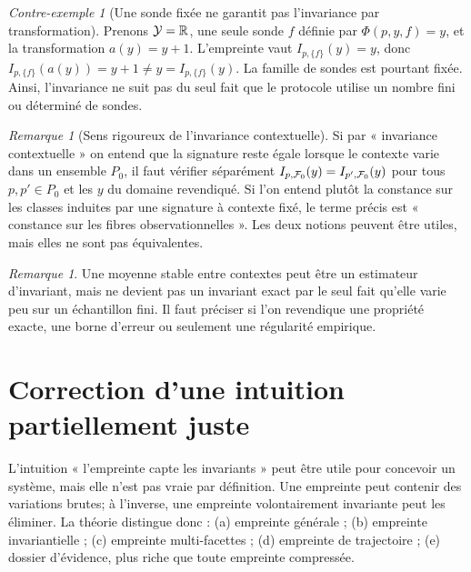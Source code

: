 \documentclass[11pt,oneside]{book}
\theoremstyle{definition}\newtheorem{definition}[theoreme]{Définition}\newtheorem{hypothese}[theoreme]{Hypothèse explicite}\newtheorem{convention}[theoreme]{Convention}\newtheorem{critere}[theoreme]{Critère}
\theoremstyle{remark}\newtheorem{remarque}[theoreme]{Remarque}\newtheorem{contreexemple}[theoreme]{Contre-exemple}
\begin{document}
\begin{contreexemple}[Une sonde fixée ne garantit pas l'invariance par transformation]
Prenons $\mathcal Y=\mathbb R$, une seule sonde $f$ définie par $\Phi(p,y,f)=y$, et la transformation $a(y)=y+1$. L'empreinte vaut $I_{p,\{f\}}(y)=y$, donc $I_{p,\{f\}}(a(y))=y+1\ne y=I_{p,\{f\}}(y)$. La famille de sondes est pourtant fixée. Ainsi, l'invariance ne suit pas du seul fait que le protocole utilise un nombre fini ou déterminé de sondes.
\end{contreexemple}
\begin{remarque}[Sens rigoureux de l'invariance contextuelle]
Si par « invariance contextuelle » on entend que la signature reste égale lorsque le contexte varie dans un ensemble $P_0$, il faut vérifier séparément $I_{p,\mathcal F_0}(y)=I_{p',\mathcal F_0}(y)$ pour tous $p,p'\in P_0$ et les $y$ du domaine revendiqué. Si l'on entend plutôt la constance sur les classes induites par une signature à contexte fixé, le terme précis est « constance sur les fibres observationnelles ». Les deux notions peuvent être utiles, mais elles ne sont pas équivalentes.
\end{remarque}
\begin{remarque}
Une moyenne stable entre contextes peut être un estimateur d'invariant, mais ne devient pas un invariant exact par le seul fait qu'elle varie peu sur un échantillon fini. Il faut préciser si l'on revendique une propriété exacte, une borne d'erreur ou seulement une régularité empirique.
\end{remarque}

\section{Correction d'une intuition partiellement juste}
L'intuition « l'empreinte capte les invariants » peut être utile pour concevoir un système, mais elle n'est pas vraie par définition. Une empreinte peut contenir des variations brutes; à l'inverse, une empreinte volontairement invariante peut les éliminer. La théorie distingue donc : (a) empreinte générale ; (b) empreinte invariantielle ; (c) empreinte multi-facettes ; (d) empreinte de trajectoire ; (e) dossier d'évidence, plus riche que toute empreinte compressée.
\end{document}
